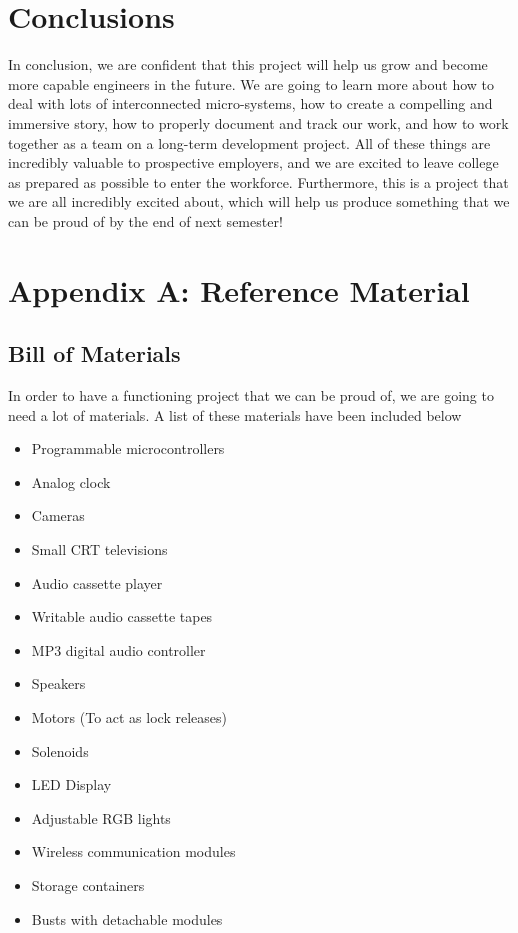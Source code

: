 \documentclass[conference]{IEEEtran}
\begin{document}
\section{Conclusions} %
In conclusion, we are confident that this project will help us grow and become more capable
engineers in the future. We are going to learn more about how to deal with lots of interconnected
micro-systems, how to create a compelling and immersive story, how to properly document and track
our work, and how to work together as a team on a long-term development project. All of these things
are incredibly valuable to prospective employers, and we are excited to leave college as prepared
as possible to enter the workforce. Furthermore, this is a project that we are all incredibly excited
about, which will help us produce something that we can be proud of by the end of next semester!

\section{Appendix A: Reference Material}

\subsection{Bill of Materials}
In order to have a functioning project that we can be proud of, we are going to need a lot of materials.
A list of these materials have been included below
\begin{itemize}
    \item Programmable microcontrollers
    \item Analog clock
    \item Cameras
    \item Small CRT televisions
    \item Audio cassette player
    \item Writable audio cassette tapes
    \item MP3 digital audio controller
    \item Speakers
    \item Motors (To act as lock releases)
    \item Solenoids
    \item LED Display
    \item Adjustable RGB lights
    \item Wireless communication modules
    \item Storage containers
    \item Busts with detachable modules
\end{itemize}
\end{document}
